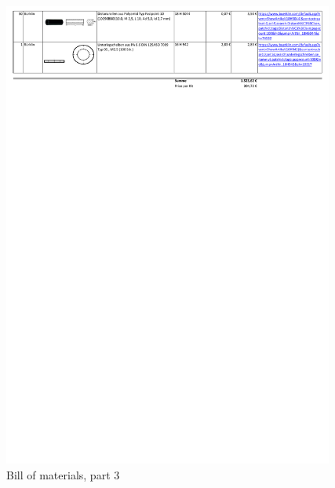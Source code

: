 \begin{figure}[H]
    \centering
    \includegraphics[trim=0 690 0 8,clip=true,width=0.97\textwidth]{fig/ch-rpi-hardware/3_Masterquad2015_BoM}
    \caption{Bill of materials, part 3}
    \label{fig:hardware:BillOfMat:3}
\end{figure}
